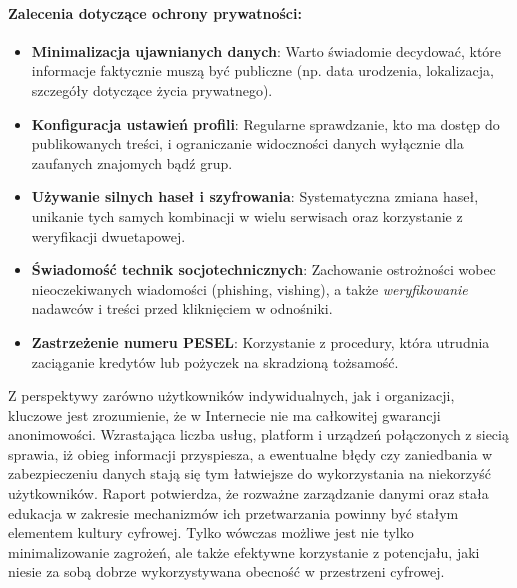\paragraph{Zalecenia dotyczące ochrony prywatności:}
\begin{itemize}
\item \textbf{Minimalizacja ujawnianych danych}: Warto świadomie decydować, które informacje faktycznie muszą być publiczne (np. data urodzenia, lokalizacja, szczegóły dotyczące życia prywatnego).
\item \textbf{Konfiguracja ustawień profili}: Regularne sprawdzanie, kto ma dostęp do publikowanych treści, i ograniczanie widoczności danych wyłącznie dla zaufanych znajomych bądź grup.
\item \textbf{Używanie silnych haseł i szyfrowania}: Systematyczna zmiana haseł, unikanie tych samych kombinacji w wielu serwisach oraz korzystanie z weryfikacji dwuetapowej.
\item \textbf{Świadomość technik socjotechnicznych}: Zachowanie ostrożności wobec nieoczekiwanych wiadomości (phishing, vishing), a także \emph{weryfikowanie} nadawców i treści przed kliknięciem w odnośniki.
\item \textbf{Zastrzeżenie numeru PESEL}: Korzystanie z procedury, która utrudnia zaciąganie kredytów lub pożyczek na skradzioną tożsamość.
\end{itemize}

\noindent
Z perspektywy zarówno użytkowników indywidualnych, jak i organizacji, kluczowe jest zrozumienie, że w Internecie nie ma całkowitej gwarancji anonimowości. Wzrastająca liczba usług, platform i urządzeń połączonych z siecią sprawia, iż obieg informacji przyspiesza, a ewentualne błędy czy zaniedbania w zabezpieczeniu danych stają się tym łatwiejsze do wykorzystania na niekorzyść użytkowników. Raport potwierdza, że rozważne zarządzanie danymi oraz stała edukacja w zakresie mechanizmów ich przetwarzania powinny być stałym elementem kultury cyfrowej. Tylko wówczas możliwe jest nie tylko minimalizowanie zagrożeń, ale także efektywne korzystanie z potencjału, jaki niesie za sobą dobrze wykorzystywana obecność w przestrzeni cyfrowej.